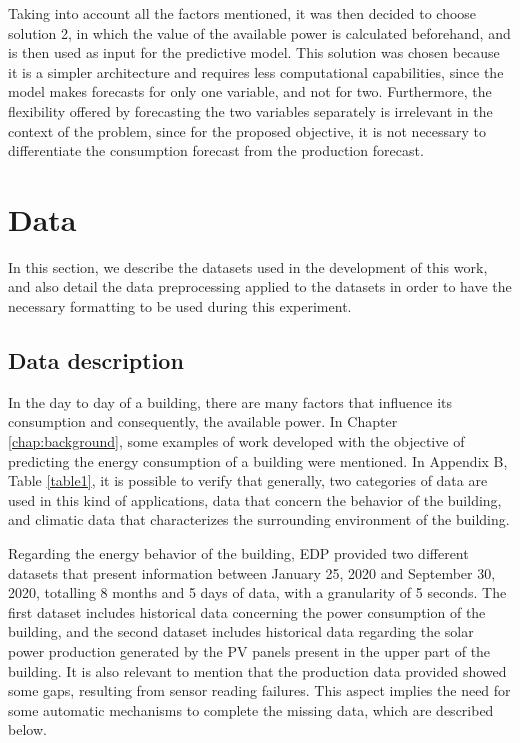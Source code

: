 Taking into account all the factors mentioned, it was then decided to choose solution 2, in which the value of the available power is calculated beforehand, and is then used as input for the predictive model. This solution was chosen because it is a simpler architecture and requires less computational capabilities, since the model makes forecasts for only one variable, and not for two. Furthermore, the flexibility offered by forecasting the two variables separately is irrelevant in the context of the problem, since for the proposed objective, it is not necessary to differentiate the consumption forecast from the production forecast. 

\section{Data}\label{chap3:sec:data}

In this section, we describe the datasets used in the development of this work, and also detail the data preprocessing applied to the datasets in order to have the necessary formatting to be used during this experiment.

\subsection{Data description}\label{chap3:subsec:data_description}

In the day to day of a building, there are many factors that influence its consumption and consequently, the available power. In Chapter \ref{chap:background}, some examples of work developed with the objective of predicting the energy consumption of a building were mentioned. In Appendix B, Table \ref{table1}, it is possible to verify that generally, two categories of data are used in this kind of applications, data that concern the behavior of the building, and climatic data that characterizes the surrounding environment of the building.

Regarding the energy behavior of the building, \ac{EDP} provided two different datasets that present information between January 25, 2020 and September 30, 2020, totalling 8 months and 5 days of data, with a granularity of 5 seconds. The first dataset includes historical data concerning the power consumption of the building, and the second dataset includes historical data regarding the solar power production generated by the \ac{PV} panels present in the upper part of the building. It is also relevant to mention that the production data provided showed some gaps, resulting from sensor reading failures. This aspect implies the need for some automatic mechanisms to complete the missing data, which are described below.

